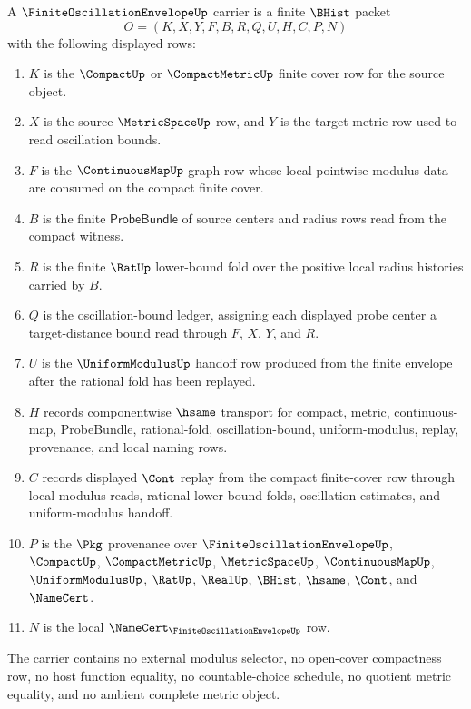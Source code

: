 \begin{definition}
\label{def:finite-oscillation-envelope-carrier}
A $\FiniteOscillationEnvelopeUp$ carrier is a finite $\BHist$ packet
$$
O=(K,X,Y,F,B,R,Q,U,H,C,P,N)
$$
with the following displayed rows:
\begin{enumerate}
\item $K$ is the $\CompactUp$ or $\CompactMetricUp$ finite cover row for the source object.
\item $X$ is the source $\MetricSpaceUp$ row, and $Y$ is the target metric row used to read oscillation bounds.
\item $F$ is the $\ContinuousMapUp$ graph row whose local pointwise modulus data are consumed on the compact finite cover.
\item $B$ is the finite $\mathsf{ProbeBundle}$ of source centers and radius rows read from the compact witness.
\item $R$ is the finite $\RatUp$ lower-bound fold over the positive local radius histories carried by $B$.
\item $Q$ is the oscillation-bound ledger, assigning each displayed probe center a target-distance bound read through $F$, $X$, $Y$, and $R$.
\item $U$ is the $\UniformModulusUp$ handoff row produced from the finite envelope after the rational fold has been replayed.
\item $H$ records componentwise $\hsame$ transport for compact, metric, continuous-map, ProbeBundle, rational-fold, oscillation-bound, uniform-modulus, replay, provenance, and local naming rows.
\item $C$ records displayed $\Cont$ replay from the compact finite-cover row through local modulus reads, rational lower-bound folds, oscillation estimates, and uniform-modulus handoff.
\item $P$ is the $\Pkg$ provenance over $\FiniteOscillationEnvelopeUp$, $\CompactUp$, $\CompactMetricUp$, $\MetricSpaceUp$, $\ContinuousMapUp$, $\UniformModulusUp$, $\RatUp$, $\RealUp$, $\BHist$, $\hsame$, $\Cont$, and $\NameCert$.
\item $N$ is the local $\NameCert_{\FiniteOscillationEnvelopeUp}$ row.
\end{enumerate}
The carrier contains no external modulus selector, no open-cover compactness row, no host function equality, no countable-choice schedule, no quotient metric equality, and no ambient complete metric object.
\end{definition}

